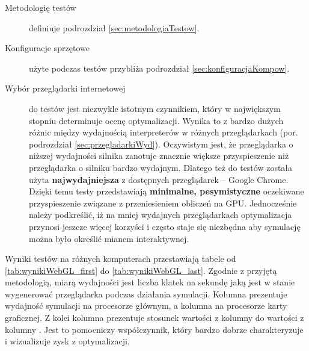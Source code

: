 \begin{description}

\item[Metodologię testów] definiuje podrozdział \ref{sec:metodologiaTestow}.

\item[Konfiguracje sprzętowe] użyte podczas testów przybliża podrozdział
\ref{sec:konfiguracjaKompow}.

\item[Wybór przeglądarki internetowej] do testów jest niezwykle istotnym
czynnikiem, który w największym stopniu determinuje ocenę optymalizacji. Wynika
to z bardzo dużych różnic między wydajnością interpreterów  w
różnych przeglądarkach (por. podrozdział \ref{sec:przegladarkiWyd}). Oczywistym
jest, że przeglądarka o niższej wydajności silnika  zanotuje
znacznie większe przyspieszenie niż przeglądarka o silniku bardzo wydajnym.
Dlatego też do testów została użyta \textbf{najwydajniejsza} z dostępnych
przeglądarek -- Google Chrome. Dzięki temu testy przedstawiają
\textbf{minimalne, pesymistyczne} oczekiwane przyspieszenie związane z
przeniesieniem obliczeń  na GPU. Jednocześnie należy podkreślić, iż na mniej
wydajnych przeglądarkach optymalizacja przynosi jeszcze więcej korzyści i
często staje się niezbędna aby symulację można było określić mianem
interaktywnej.

\end{description}

Wyniki testów na różnych komputerach przestawiają tabele od
\ref{tab:wynikiWebGL_first} do \ref{tab:wynikiWebGL_last}. Zgodnie z przyjętą
metodologią, miarą wydajności jest liczba klatek na sekundę jaką jest w stanie
wygenerować przeglądarka podczas działania symulacji. Kolumna 
prezentuje wydajność symulacji na procesorze głównym, a kolumna  na
procesorze karty graficznej. Z kolei kolumna  prezentuje stosunek
wartości z kolumny  do wartości z kolumny . Jest to pomocniczy
współczynnik, który bardzo dobrze charakteryzuje i wizualizuje zysk z
optymalizacji.

